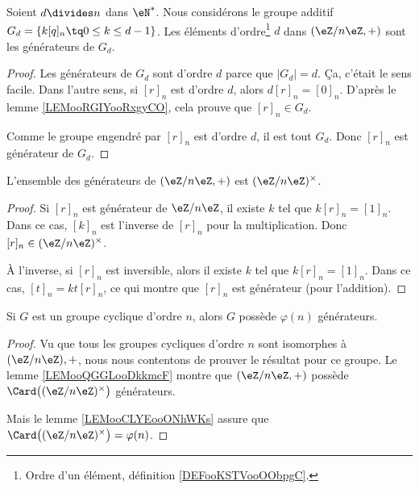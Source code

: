 \begin{lemma}		\label{LEMooKPKBooPbrHkI}
	Soient \( d\divides n\) dans \( \eN^*\). Nous considérons le groupe additif \( G_d=\{ k[q]_n\tq 0\leq k\leq d-1 \}\). Les éléments d'ordre\footnote{Ordre d'un élément, définition \ref{DEFooKSTVooOObpgC}.} \( d\) dans \( (\eZ/n\eZ,+)\) sont les générateurs de \( G_d\).
\end{lemma}

\begin{proof}
	Les générateurs de \( G_d\) sont d'ordre \( d\) parce que \( | G_d |=d\). Ça, c'était le sens facile. Dans l'autre sens, si \( [r]_n\) est d'ordre \( d\), alors \( d[r]_n=[0]_n\). D'après le lemme \ref{LEMooRGIYooRxgyCO}, cela prouve que \( [r]_n\in G_d\).

	Comme le groupe engendré par \( [r]_n\) est d'ordre \( d\), il est tout \( G_d\). Donc \( [r]_n\) est générateur de \( G_d\).
\end{proof}


\begin{lemma}		\label{LEMooQGGLooDkkmcF}
	L'ensemble des générateurs de \( (\eZ/n\eZ,+)\) est \( (\eZ/n\eZ)^{\times}\).
\end{lemma}

\begin{proof}
	Si \( [r]_n\) est générateur de \( \eZ/n\eZ\), il existe \( k\) tel que \( k[r]_n=[1]_n\). Dans ce cas, \( [k]_n\) est l'inverse de \( [r]_n\) pour la multiplication. Donc \( [r]_n\in(\eZ/n\eZ)^{\times}\).

	À l'inverse, si \( [r]_n\) est inversible, alors il existe \( k\) tel que \( k[r]_n=[1]_n\). Dans ce cas, \( [t]_n=kt[r]_n\), ce qui montre que \( [r]_n\) est générateur (pour l'addition).
\end{proof}

\begin{lemma}		\label{LEMooRMWRooRSjGPL}
	Si \( G\) est un groupe cyclique d'ordre \( n\), alors \( G\) possède \( \varphi(n)\) générateurs.
\end{lemma}

\begin{proof}
	Vu que tous les groupes cycliques d'ordre \( n\) sont isomorphes à \( (\eZ/n\eZ),+\), nous nous contentons de prouver le résultat pour ce groupe. Le lemme \ref{LEMooQGGLooDkkmcF} montre que \( (\eZ/n\eZ,+)\) possède \( \Card\big( (\eZ/n\eZ)^{\times} \big)\) générateurs.

	Mais le lemme \ref{LEMooCLYEooONhWKs} assure que \( \Card\big( (\eZ/n\eZ)^{\times} \big)=\varphi(n)\).
\end{proof}

